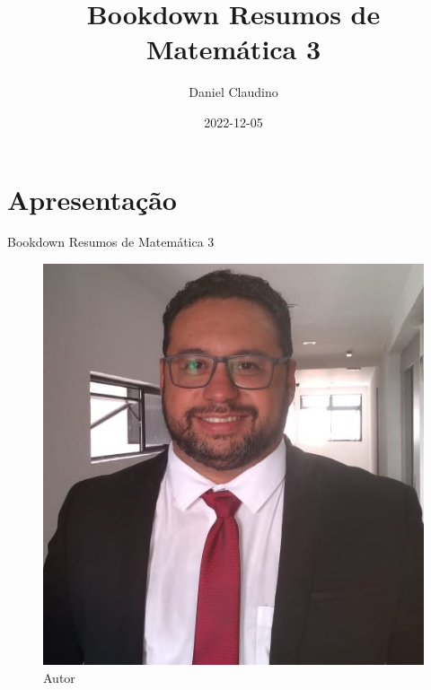 \documentclass[
]{book}
\title{Bookdown Resumos de Matemática 3}
\author{Daniel Claudino}
\date{2022-12-05}
\begin{document}
\maketitle

{
\setcounter{tocdepth}{1}
\tableofcontents
}
\hypertarget{apresentauxe7uxe3o}{%
\chapter{Apresentação}\label{apresentauxe7uxe3o}}

Bookdown Resumos de Matemática 3

\begin{figure}

{\centering \includegraphics[width=0.5\linewidth]{imagens/FOTO-PERFIL-DANIEL-CLAUDINO-2020} 

}

\caption{Autor}\label{fig:unnamed-chunk-1}
\end{figure}
\end{document}
